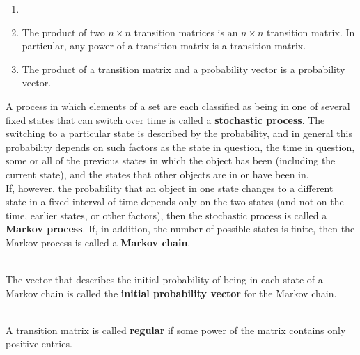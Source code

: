 \begin{corollary}
	\begin{enumerate}
		\item[]
		\item The product of two $n \times n$ transition matrices is an $n \times n$ transition matrix. In particular, any power of a transition matrix is a transition matrix.
		\item The product of a transition matrix and a probability vector is a probability vector.
	\end{enumerate}
\end{corollary}

\begin{definition}
	A process in which elements of a set are each classified as being in one of several fixed states that can switch over time is called a \textbf{stochastic process}. The switching to a particular state is described by the probability, and in general this probability depends on such factors as the state in question, the time in question, some or all of the previous states in which the object has been (including the current state), and the states that other objects are in or have been in.\\

	If, however, the probability that an object in one state changes to a different state in a fixed interval of time depends only on the two states (and not on the time, earlier states, or other factors), then the stochastic process is called a \textbf{Markov process}. If, in addition, the number of possible states is finite, then the Markov process is called a \textbf{Markov chain}.
\end{definition}

\begin{definition}
	\hfill\\
	The vector that describes the initial probability of being in each state of a Markov chain is called the \textbf{initial probability vector} for the Markov chain.
\end{definition}

\begin{definition}
	\hfill\\
	A transition matrix is called \textbf{regular} if some power of the matrix contains only positive entries.
\end{definition}

